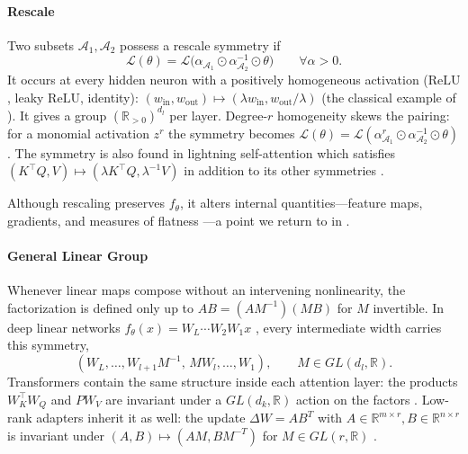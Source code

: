 \documentclass[mathematics,review,submit,moreauthors]{Definitions/mdpi}
\begin{document}
\paragraph{Rescale}
Two subsets $\mathcal{A}_1,\mathcal{A}_2$ possess a rescale symmetry if \citep{kunin2020}
\begin{equation*}
    \mathcal{L}(\theta)=\mathcal{L}\big(\alpha_{\mathcal{A}_1}\odot\alpha_{\mathcal{A}_2}^{-1}\odot\theta\big) \qquad \forall\alpha>0.
\end{equation*}
It occurs at every hidden neuron with a positively homogeneous activation ($\mathrm{ReLU}$, leaky $\mathrm{ReLU}$, identity): $(w_{\mathrm{in}},w_{\mathrm{out}})\mapsto(\lambda w_{\mathrm{in}},w_{\mathrm{out}}/\lambda)$ (the classical example of ).
It gives a group $(\mathbb{R}_{>0})^{d_l}$ per layer.
Degree-$r$ homogeneity skews the pairing: for a monomial activation $z^r$ the symmetry becomes $\mathcal{L}(\theta)=\mathcal{L}(\alpha_{\mathcal{A}_1}^{r}\odot\alpha_{\mathcal{A}_2}^{-1}\odot\theta)$.
The symmetry is also found in lightning self-attention which satisfies $(K^{\top}Q,V)\mapsto(\lambda K^{\top}Q,\lambda^{-1}V)$ in addition to its other symmetries \citep{henry2025}.

Although rescaling preserves $f_\theta$, it alters internal quantities---feature maps, gradients, and measures of flatness \citep{armenta2021b}---a point we return to in .

\paragraph{General Linear Group}
Whenever linear maps compose without an intervening nonlinearity, the factorization is defined only up to $AB=(AM^{-1})(MB)$ for $M$ invertible.
In deep linear networks $f_\theta(x)=W_L\cdots W_2W_1x$ \citep{saxe2014piclr2}, every intermediate width carries this symmetry,
\begin{equation*}
    (W_L,\dots,W_{l+1}M^{-1},\,MW_l,\dots,W_1), \qquad M\in GL(d_l,\mathbb{R}).
\end{equation*}
Transformers contain the same structure inside each attention layer: the products $W_K^{\top}W_Q$ and $PW_V$ are invariant under a $GL(d_k,\mathbb{R})$ action on the factors \citep{kobayashi2024anips}.
Low-rank adapters \citep[LoRA,][]{hu2021} inherit it as well: the update $\Delta W=AB^T$ with $A\in \mathbb R^{m\times r}, B\in \mathbb R^{n\times r}$ is invariant under $(A, B)\mapsto(AM, BM^{-T})$ for $M\in GL(r,\mathbb{R})$ \citep{yen2025iclr}.
\end{document}
